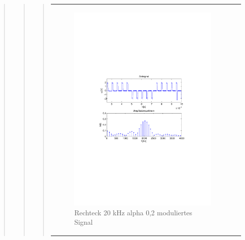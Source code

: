 \begin{quote}
\begin{quote}
\begin{quote}
    
             
             
             
             
             
             \begin{center}
            \begin{tabular}{ll}
            
            \hspace{-5cm}
                \begin{minipage}{0.6\textwidth}
                    \begin{figure}[H]
                        \includegraphics[scale=0.7, trim = 35mm 100mm 35mm 95mm, clip]{Bilder/shaperec20_02abget_zeit}
                          \caption{Rechteck 20 kHz alpha 0,2 moduliertes Signal}
		                  \label{fig:shaperec20_02zeit}
                    \end{figure}
                \end{minipage}
                

\end{tabular}
\end{center}
\end{quote}
\end{quote}
\end{quote}

